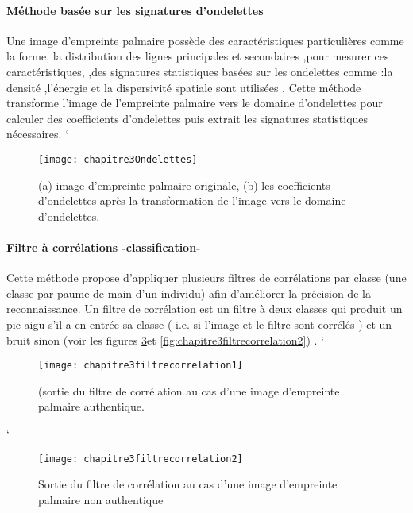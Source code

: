 {{\paragraph{	Méthode basée sur les signatures d’ondelettes  }
Une image d’empreinte palmaire possède des caractéristiques particulières comme la forme, la distribution des lignes principales et secondaires ,pour mesurer ces caractéristiques, ,des signatures statistiques basées sur les ondelettes  comme :la densité ,l’énergie et la dispersivité spatiale sont utilisées .
Cette méthode transforme l’image de l’empreinte palmaire vers le domaine d’ondelettes pour calculer des coefficients d’ondelettes puis extrait les signatures statistiques nécessaires.
`\begin{center}
	\begin{figure}[H]
		\centering
		 \texttt{[image: chapitre3Ondelettes]}
		\caption{ (a) image d’empreinte palmaire originale, (b) les coefficients d’ondelettes après la transformation de l’image vers le domaine d’ondelettes.}
		\label{fig:chapitre3Ondelettes}
	\end{figure}
\end{center}
\paragraph{Filtre à corrélations -classification- }
Cette méthode propose d’appliquer plusieurs filtres de corrélations par classe (une classe par paume de main d’un individu) afin d’améliorer la précision de la reconnaissance.
Un filtre de corrélation est un filtre à deux classes qui produit un pic aigu s’il a en entrée  sa classe ( i.e. si l’image et le filtre sont corrélés ) et un bruit sinon (voir les figures \ref{fig:chapitre3filtrecorrelation1}et \ref{fig:chapitre3filtrecorrelation2}) \citep{hennings2007palmprint}.
`\begin{center}
	\begin{figure}[H]
		\centering
		 \texttt{[image: chapitre3filtrecorrelation1]}
		\caption{ (sortie du filtre de corrélation au cas d’une image d’empreinte palmaire authentique.}
		\label{fig:chapitre3filtrecorrelation1}
	\end{figure}
\end{center}
`\begin{center}
	\begin{figure}[H]
		\centering
		 \texttt{[image: chapitre3filtrecorrelation2]}
		\caption{Sortie du filtre de corrélation au cas d’une image d’empreinte palmaire non authentique}
		\label{fig:chapitre3filtrecorrelation1}
	\end{figure}
\end{center}
}}
